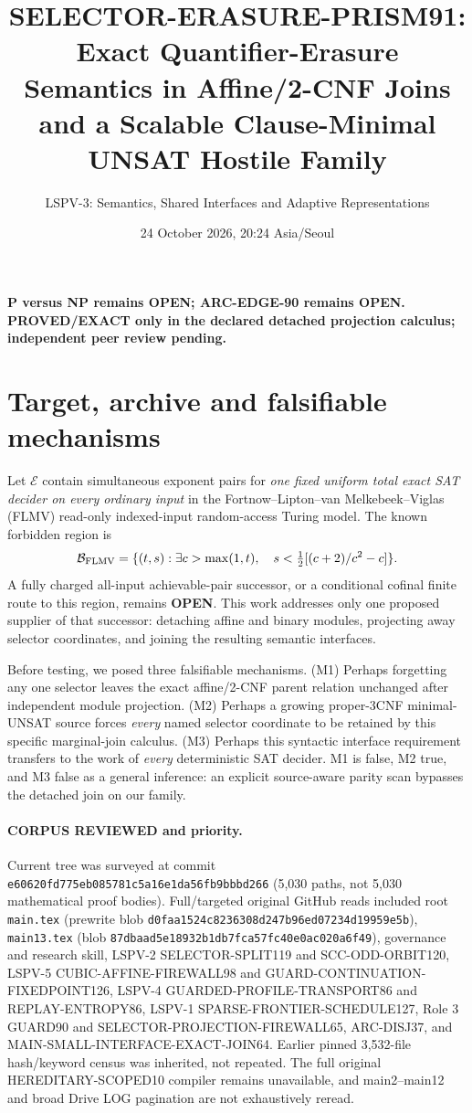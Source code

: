 \documentclass[11pt]{article}
\title{SELECTOR-ERASURE-PRISM91:\\
Exact Quantifier-Erasure Semantics in Affine/2-CNF Joins\\
and a Scalable Clause-Minimal UNSAT Hostile Family}
\author{LSPV-3: Semantics, Shared Interfaces and Adaptive Representations}
\date{24 October 2026, 20:24 Asia/Seoul}
\newcommand{\OPEN}{\textbf{OPEN}}
\begin{document}
\maketitle
\begin{center}
\textbf{P versus NP remains OPEN; ARC-EDGE-90 remains OPEN.}\\
\textbf{PROVED/EXACT only in the declared detached projection calculus; independent peer review pending.}
\end{center}

\section{Target, archive and falsifiable mechanisms}
Let $\mathcal E$ contain simultaneous exponent pairs for \emph{one fixed uniform total exact SAT decider on every ordinary input} in the Fortnow--Lipton--van Melkebeek--Viglas (FLMV) read-only indexed-input random-access Turing model. The known forbidden region is
\[
 \mathcal B_{\rm FLMV}
 =\{(t,s):\exists c>\max(1,t),\quad
 s<\tfrac12[(c+2)/c^2-c]\}.
\]
A fully charged all-input achievable-pair successor, or a conditional cofinal finite route to this region, remains \OPEN. This work addresses only one proposed supplier of that successor: detaching affine and binary modules, projecting away selector coordinates, and joining the resulting semantic interfaces.

Before testing, we posed three falsifiable mechanisms. (M1) Perhaps forgetting any one selector leaves the exact affine/2-CNF parent relation unchanged after independent module projection. (M2) Perhaps a growing proper-3CNF minimal-UNSAT source forces \emph{every} named selector coordinate to be retained by this specific marginal-join calculus. (M3) Perhaps this syntactic interface requirement transfers to the work of \emph{every} deterministic SAT decider. M1 is false, M2 true, and M3 false as a general inference: an explicit source-aware parity scan bypasses the detached join on our family.

\paragraph{CORPUS REVIEWED and priority.}
Current tree was surveyed at commit \texttt{e60620fd775eb085781c5a16e1da56fb9bbbd266} (5,030 paths, not 5,030 mathematical proof bodies). Full/targeted original GitHub reads included root \texttt{main.tex} (prewrite blob \texttt{d0faa1524c8236308d247b96ed07234d19959e5b}), \texttt{main13.tex} (blob \texttt{87dbaad5e18932b1db7fca57fc40e0ac020a6f49}), governance and research skill, LSPV-2 SELECTOR-SPLIT119 and SCC-ODD-ORBIT120, LSPV-5 CUBIC-AFFINE-FIREWALL98 and GUARD-CONTINUATION-FIXEDPOINT126, LSPV-4 GUARDED-PROFILE-TRANSPORT86 and REPLAY-ENTROPY86, LSPV-1 SPARSE-FRONTIER-SCHEDULE127, Role 3 GUARD90 and SELECTOR-PROJECTION-FIREWALL65, ARC-DISJ37, and MAIN-SMALL-INTERFACE-EXACT-JOIN64. Earlier pinned 3,532-file hash/keyword census was inherited, not repeated. The full original HEREDITARY-SCOPED10 compiler remains unavailable, and main2--main12 and broad Drive LOG pagination are not exhaustively reread.
\end{document}
